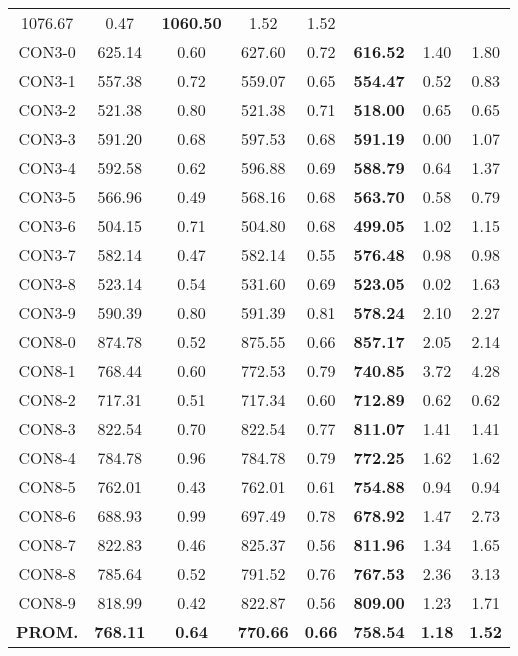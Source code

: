 \begin{table}[ht]
\begin{tabular}{c c c c c c c c}
1076.67 & 0.47 & \bf{1060.50} & 
1.52 & 1.52\\CON3-0 & 625.14 & 0.60 & 
627.60 & 0.72 & \bf{616.52} & 
1.40 & 1.80\\CON3-1 & 557.38 & 0.72 & 
559.07 & 0.65 & \bf{554.47} & 
0.52 & 0.83\\CON3-2 & 521.38 & 0.80 & 
521.38 & 0.71 & \bf{518.00} & 
0.65 & 0.65\\CON3-3 & 591.20 & 0.68 & 
597.53 & 0.68 & \bf{591.19} & 
0.00 & 1.07\\CON3-4 & 592.58 & 0.62 & 
596.88 & 0.69 & \bf{588.79} & 
0.64 & 1.37\\CON3-5 & 566.96 & 0.49 & 
568.16 & 0.68 & \bf{563.70} & 
0.58 & 0.79\\CON3-6 & 504.15 & 0.71 & 
504.80 & 0.68 & \bf{499.05} & 
1.02 & 1.15\\CON3-7 & 582.14 & 0.47 & 
582.14 & 0.55 & \bf{576.48} & 
0.98 & 0.98\\CON3-8 & 523.14 & 0.54 & 
531.60 & 0.69 & \bf{523.05} & 
0.02 & 1.63\\CON3-9 & 590.39 & 0.80 & 
591.39 & 0.81 & \bf{578.24} & 
2.10 & 2.27\\CON8-0 & 874.78 & 0.52 & 
875.55 & 0.66 & \bf{857.17} & 
2.05 & 2.14\\CON8-1 & 768.44 & 0.60 & 
772.53 & 0.79 & \bf{740.85} & 
3.72 & 4.28\\CON8-2 & 717.31 & 0.51 & 
717.34 & 0.60 & \bf{712.89} & 
0.62 & 0.62\\CON8-3 & 822.54 & 0.70 & 
822.54 & 0.77 & \bf{811.07} & 
1.41 & 1.41\\CON8-4 & 784.78 & 0.96 & 
784.78 & 0.79 & \bf{772.25} & 
1.62 & 1.62\\CON8-5 & 762.01 & 0.43 & 
762.01 & 0.61 & \bf{754.88} & 
0.94 & 0.94\\CON8-6 & 688.93 & 0.99 & 
697.49 & 0.78 & \bf{678.92} & 
1.47 & 2.73\\CON8-7 & 822.83 & 0.46 & 
825.37 & 0.56 & \bf{811.96} & 
1.34 & 1.65\\CON8-8 & 785.64 & 0.52 & 
791.52 & 0.76 & \bf{767.53} & 
2.36 & 3.13\\CON8-9 & 818.99 & 0.42 & 
822.87 & 0.56 & \bf{809.00} & 
1.23 & 1.71\\\bf{PROM.} & 
\bf{768.11} & \bf{0.64} & \bf{770.66} & \bf{0.66} & \bf{758.54} & \bf{1.18} & \bf{1.52}\\[1ex]\hline
\end{tabular}
\label{table:nonlin}
\end{table} 
\clearpage
